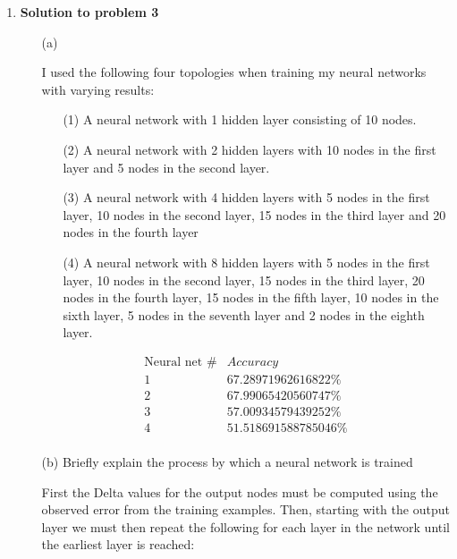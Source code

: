 \begin{enumerate}

	\item {\bf Solution to problem 3}
	
		\begin{enumerate}
		
			\item[(a)] 
			
			I used the following four topologies when training my neural networks with varying results:
			
				\begin{enumerate}
				
					\item[(1)] A neural network with 1 hidden layer consisting of 10 nodes.
				
					\item[(2)] A neural network with 2 hidden layers with 10 nodes in the first layer and 5 nodes in the second layer.
				
					\item[(3)] A neural network with 4 hidden layers with 5 nodes in the first layer, 10 nodes in the second layer, 15 nodes in the third layer and 20 nodes in the fourth layer
				
					\item[(4)] A neural network with 8 hidden layers with 5 nodes in the first layer, 10 nodes in the second layer, 15 nodes in the third layer, 20 nodes in the fourth layer, 15 nodes in the fifth layer, 10 nodes in the sixth layer, 5 nodes in the seventh layer and 2 nodes in the eighth layer.
				
				\end{enumerate}
				
				\[
					\begin{array}{c|c}
						\text{Neural net \#} & Accuracy \\
						\hline
						1 & 67.28971962616822\% \\
						2 & 67.99065420560747\% \\
						3 & 57.00934579439252\% \\
						4 & 51.518691588785046\% \\
					\end{array}
				\]
			
			\item[(b)] Briefly explain the process by which a neural network is trained
			
			First the Delta values for the output nodes must be computed using the observed error from the training examples.  Then, starting with the output layer we must then repeat the following for each layer in the network until the earliest layer is reached:
			

\end{enumerate}
\end{enumerate}

